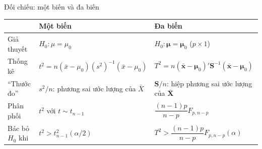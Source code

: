 \begin{frame}{Đối chiếu: một biến và đa biến}
  \vspace{0.1cm}
  \centering
  \small
  \renewcommand{\arraystretch}{1.55}
  \begin{tabular}{@{}p{2.7cm}p{4.9cm}p{5.9cm}@{}}
    \toprule
    & \textcolor{hustgray}{\textbf{Một biến}} & \textcolor{hustnavy}{\textbf{Đa biến}} \\
    \midrule
    Giả thuyết & \(H_0:\mu=\mu_0\) & \(H_0:\boldsymbol{\mu}=\boldsymbol{\mu}_0\) \;(\(p\times 1\)) \\
    Thống kê & \(t^2 = n(\bar{x}-\mu_0)(s^2)^{-1}(\bar{x}-\mu_0)\) & \(T^2 = n(\bar{\mathbf{x}}-\boldsymbol{\mu}_0)'\mathbf{S}^{-1}(\bar{\mathbf{x}}-\boldsymbol{\mu}_0)\) \\
    ``Thước đo'' & \(s^2/n\): phương sai ước lượng của \(\bar{X}\) & \(\mathbf{S}/n\): hiệp phương sai ước lượng của \(\bar{\mathbf{X}}\) \\
    Phân phối & \(t^2\) với \(t\sim t_{n-1}\) & \(\dfrac{(n-1)p}{n-p}F_{p,n-p}\) \\
    Bác bỏ \(H_0\) khi & \(t^2 > t^2_{n-1}(\alpha/2)\) & \(T^2 > \dfrac{(n-1)p}{n-p}F_{p,n-p}(\alpha)\) \\
    \bottomrule
  \end{tabular}

  \vspace{0.25cm}
  \raggedright
\end{frame}

